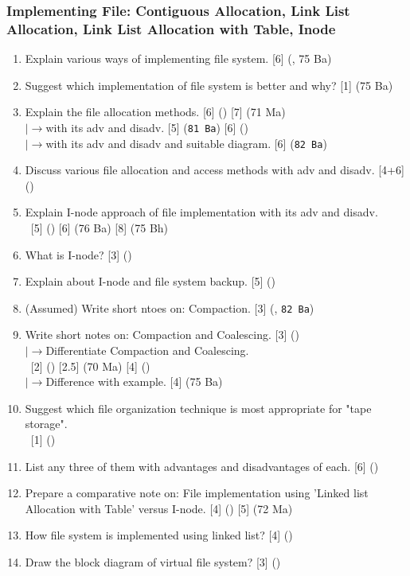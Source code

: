 \documentclass[12pt]{article}
\newcommand{\lb}{\\$\left|\rightarrow\right.$}
\newcommand{\enter}{\\\textcolor{white}{1}}
\begin{document}
		\subsubsection{Implementing File: Contiguous Allocation, Link List Allocation, Link List Allocation with Table, Inode}
			\begin{enumerate}[noitemsep, topsep=0pt]
				\item Explain various ways of implementing file system. \hfill [6] (, 75 Ba)

				\item Suggest which implementation of file system is better and why? \hfill [1] (75 Ba)

				\item Explain the file allocation methods. \hfill [6] () [7] (71 Ma)
				\lb with its adv and disadv. \hfill [5] (\texttt{81 Ba}) [6] ()
				\lb with its adv and disadv and suitable diagram. \hfill [6] (\texttt{82 Ba})

				\item Discuss various file allocation and access methods with adv and disadv. \hfill [4+6] ()

				\item Explain I-node approach of file implementation with its adv and disadv.
				\enter\hfill [5] () [6] (76 Ba) [8] (75 Bh)

				\item What is I-node? \hfill [3] ()

				\item Explain about I-node and file system backup. \hfill [5] ()

				\item (Assumed) Write short ntoes on: Compaction. \hfill [3] (, \texttt{82 Ba})
				
				\item Write short notes on: Compaction and Coalescing. \hfill [3] ()
				\lb Differentiate Compaction and Coalescing.
				\enter\hfill [2] () [2.5] (70 Ma) [4] ()
				\lb Difference with example. \hfill [4] (75 Ba)

				\item Suggest which file organization technique is most appropriate for "tape storage".
				\enter\hfill [1] ()

				\item List any three of them with advantages and disadvantages of each. \hfill [6] ()

				\item Prepare a comparative note on: File implementation using 'Linked list Allocation with Table' versus I-node. \hfill [4] () [5] (72 Ma)

				\item How file system is implemented using linked list? \hfill [4] ()

				\item Draw the block diagram of virtual file system? \hfill [3] ()
			\end{enumerate}					
		
\end{document}
